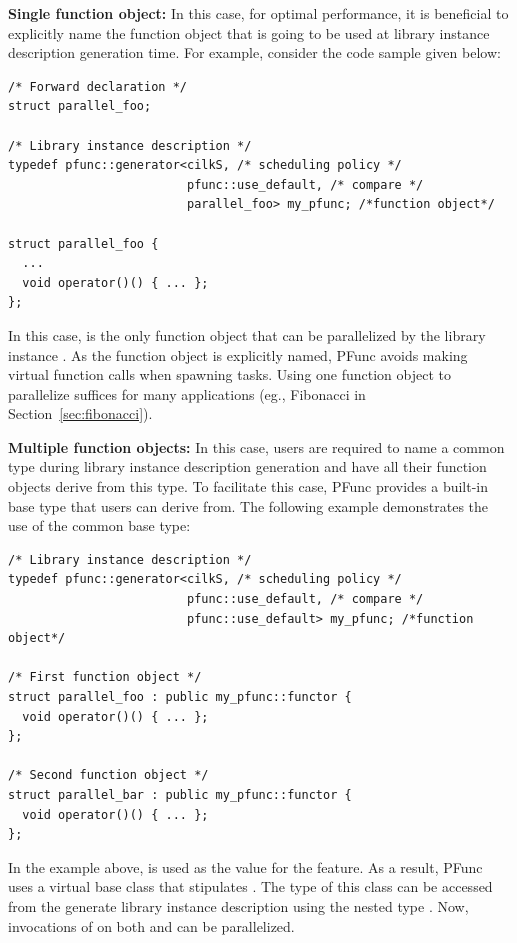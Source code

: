 \begin{list}{}{\leftmargin=1em}
\item \textbf{Single function object:} In this case, for optimal performance, 
it is beneficial to explicitly name the function object that is going to be 
used at library instance description generation time. For example, consider 
the code sample given below:

\begin{lstlisting}
/* Forward declaration */
struct parallel_foo;

/* Library instance description */
typedef pfunc::generator<cilkS, /* scheduling policy */
                         pfunc::use_default, /* compare */
                         parallel_foo> my_pfunc; /*function object*/

struct parallel_foo {
  ...
  void operator()() { ... };
};
\end{lstlisting}

In this case,  is the only function object that can be 
parallelized by the library instance . As the function object 
is explicitly named, PFunc avoids making virtual function calls when spawning 
tasks. Using one function object to parallelize suffices for many applications
(eg., Fibonacci in Section~\ref{sec:fibonacci}).

\item \textbf{Multiple function objects:} In this case, users are required to
name a common type during library instance description generation and have all
their function objects derive from this type.  To facilitate this case, PFunc
provides a built-in base type that users can derive from. The following example
demonstrates the use of the common base type:

\begin{lstlisting}
/* Library instance description */
typedef pfunc::generator<cilkS, /* scheduling policy */
                         pfunc::use_default, /* compare */
                         pfunc::use_default> my_pfunc; /*function object*/

/* First function object */
struct parallel_foo : public my_pfunc::functor {
  void operator()() { ... };
};

/* Second function object */
struct parallel_bar : public my_pfunc::functor {
  void operator()() { ... };
};
\end{lstlisting}

In the example above,  is used as the value for the
 feature. As a result, PFunc uses a virtual base class
that stipulates . The type of this class can be accessed from
the generate library instance description using the nested type
. Now, invocations of  on both
 and  can be parallelized.

\end{list}


